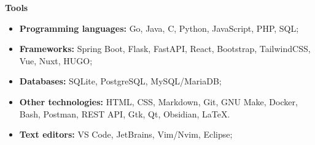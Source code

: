 {\vspace{0.5cm} \hspace{-0.5cm} \Large \textbf{Tools}}

\begin{itemize}
    \item \textbf{Programming languages:} Go, Java, C, Python, JavaScript, PHP, SQL;
    \item \textbf{Frameworks:} Spring Boot, Flask, FastAPI, React, Bootstrap, TailwindCSS, Vue, Nuxt, HUGO;
    \item \textbf{Databases:} SQLite, PostgreSQL, MySQL/MariaDB;
    \item \textbf{Other technologies:} HTML, CSS, Markdown, Git, GNU Make, Docker, Bash, Postman, 
        REST API, Gtk, Qt, Obsidian, LaTeX.
    \item \textbf{Text editors:} VS Code, JetBrains, Vim/Nvim, Eclipse;
\end{itemize}